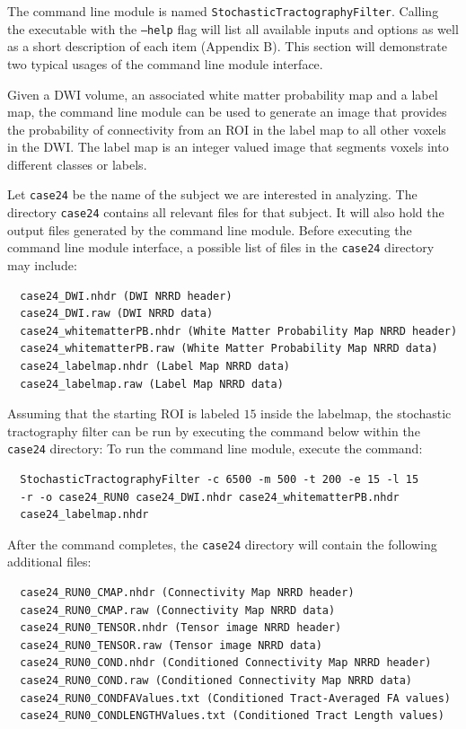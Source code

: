 The command line module is named \texttt{StochasticTractographyFilter}.  Calling the executable with the \texttt{--help} flag will list all available inputs and options as well as a short description of each item (Appendix B).  This section will demonstrate two typical usages of the command line module interface.

Given a DWI volume, an associated white matter probability map and a label map, the command line module can be used to generate an image that provides the probability of connectivity from an ROI in the label map to all other voxels in the DWI.  The label map is an integer valued image that segments voxels into different classes or labels.

Let \texttt{case24} be the name of the subject we are interested in analyzing.  The directory \texttt{case24} contains all relevant files for that subject.  It will also hold the output files generated by the command line module.  Before executing the command line module interface, a possible list of files in the \texttt{case24} directory may include:
\begin{verbatim}
  case24_DWI.nhdr (DWI NRRD header)
  case24_DWI.raw (DWI NRRD data)
  case24_whitematterPB.nhdr (White Matter Probability Map NRRD header)
  case24_whitematterPB.raw (White Matter Probability Map NRRD data)
  case24_labelmap.nhdr (Label Map NRRD data)
  case24_labelmap.raw (Label Map NRRD data)
\end{verbatim}
Assuming that the starting ROI is labeled $15$ inside the labelmap, the stochastic tractography filter can be run by executing the command below within the \texttt{case24} directory: 
To run the command line module, execute the command:
\begin{verbatim}
  StochasticTractographyFilter -c 6500 -m 500 -t 200 -e 15 -l 15
  -r -o case24_RUN0 case24_DWI.nhdr case24_whitematterPB.nhdr
  case24_labelmap.nhdr
\end{verbatim}
After the command completes, the \texttt{case24} directory will contain the following additional files:
\begin{verbatim}
  case24_RUN0_CMAP.nhdr (Connectivity Map NRRD header)
  case24_RUN0_CMAP.raw (Connectivity Map NRRD data)
  case24_RUN0_TENSOR.nhdr (Tensor image NRRD header)
  case24_RUN0_TENSOR.raw (Tensor image NRRD data)
  case24_RUN0_COND.nhdr (Conditioned Connectivity Map NRRD header)
  case24_RUN0_COND.raw (Conditioned Connectivity Map NRRD data)
  case24_RUN0_CONDFAValues.txt (Conditioned Tract-Averaged FA values)
  case24_RUN0_CONDLENGTHValues.txt (Conditioned Tract Length values)
\end{verbatim}


